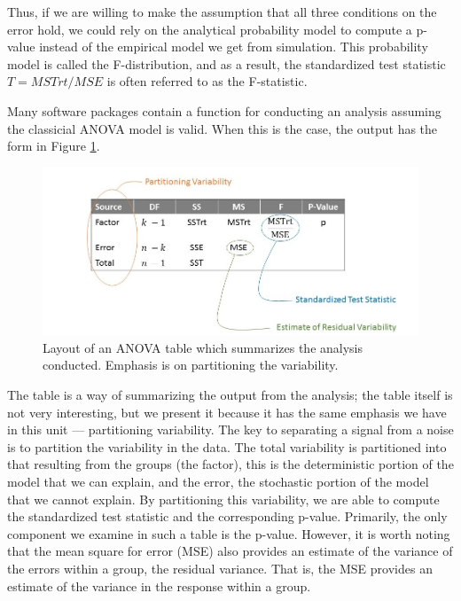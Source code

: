 \documentclass[]{book}
\theoremstyle{definition}
\theoremstyle{definition}
\theoremstyle{definition}
\theoremstyle{remark}
\begin{document}
Thus, if we are willing to make the assumption that all three conditions
on the error hold, we could rely on the analytical probability model to
compute a p-value instead of the empirical model we get from simulation.
This probability model is called the F-distribution, and as a result,
the standardized test statistic \(T = MSTrt/MSE\) is often referred to
as the F-statistic.

Many software packages contain a function for conducting an analysis
assuming the classicial ANOVA model is valid. When this is the case, the
output has the form in Figure \ref{fig:anovaclassical-table}.

\begin{figure}

{\centering \includegraphics[width=0.8\linewidth]{./images/ANOVAclassical-Table} 

}

\caption{Layout of an ANOVA table which summarizes the analysis conducted.  Emphasis is on partitioning the variability.}\label{fig:anovaclassical-table}
\end{figure}

The table is a way of summarizing the output from the analysis; the
table itself is not very interesting, but we present it because it has
the same emphasis we have in this unit --- partitioning variability. The
key to separating a signal from a noise is to partition the variability
in the data. The total variability is partitioned into that resulting
from the groups (the factor), this is the deterministic portion of the
model that we can explain, and the error, the stochastic portion of the
model that we cannot explain. By partitioning this variability, we are
able to compute the standardized test statistic and the corresponding
p-value. Primarily, the only component we examine in such a table is the
p-value. However, it is worth noting that the mean square for error
(MSE) also provides an estimate of the variance of the errors within a
group, the residual variance. That is, the MSE provides an estimate of
the variance in the response within a group.
\end{document}
